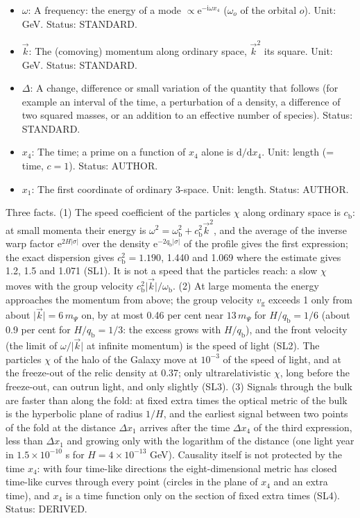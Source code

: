\documentclass[
  10pt,
]{article}
\begin{document}
\begin{itemize}
  differentials. Status: STANDARD.
\item
  \(\omega\): A frequency: the energy of a mode
  \(\propto \mathrm{e}^{-\mathrm{i}\omega x_4}\) (\(\omega_o\) of the
  orbital \(o\)). Unit: GeV. Status: STANDARD.
\item
  \(\vec k\): The (comoving) momentum along ordinary space, \(\vec k^2\)
  its square. Unit: GeV. Status: STANDARD.
\item
  \(\Delta\): A change, difference or small variation of the quantity
  that follows (for example an interval of the time, a perturbation of a
  density, a difference of two squared masses, or an addition to an
  effective number of species). Status: STANDARD.
\item
  \(x_4\): The time; a prime on a function of \(x_4\) alone is
  \(\mathrm{d}/\mathrm{d}x_4\). Unit: length (= time, \(c = 1\)).
  Status: AUTHOR.
\item
  \(x_1\): The first coordinate of ordinary 3-space. Unit: length.
  Status: AUTHOR.
\end{itemize}

Three facts. (1) The speed coefficient of the particles \(\chi\) along
ordinary space is \(c_{\mathrm{b}}\): at small momenta their energy is
\(\omega^2 = \omega_{\mathrm{b}}^2 + c_{\mathrm{b}}^2\vec k^2\), and the
average of the inverse warp factor \(\mathrm{e}^{2H\lvert\sigma\rvert}\)
over the density \(\mathrm{e}^{-2q_{\mathrm{b}}\lvert\sigma\rvert}\) of
the profile gives the first expression; the exact dispersion gives
\(c_{\mathrm{b}}^2 = 1.190\), 1.440 and 1.069 where the estimate gives
1.2, 1.5 and 1.071 (SL1). It is not a speed that the particles reach: a
slow \(\chi\) moves with the group velocity
\(c_{\mathrm{b}}^2\lvert\vec k\rvert/\omega_{\mathrm{b}}\). (2) At large
momenta the energy approaches the momentum from above; the group
velocity \(v_{\mathrm{g}}\) exceeds 1 only from about
\(\lvert\vec k\rvert = 6\,m_\Psi\) on, by at most 0.46 per cent near
\(13\,m_\Psi\) for \(H/q_{\mathrm{b}} = 1/6\) (about 0.9 per cent for
\(H/q_{\mathrm{b}} = 1/3\): the excess grows with \(H/q_{\mathrm{b}}\)),
and the front velocity (the limit of \(\omega/\lvert\vec k\rvert\) at
infinite momentum) is the speed of light (SL2). The particles \(\chi\)
of the halo of the Galaxy move at \(10^{-3}\) of the speed of light, and
at the freeze-out of the relic density at 0.37; only ultrarelativistic
\(\chi\), long before the freeze-out, can outrun light, and only
slightly (SL3). (3) Signals through the bulk are faster than along the
fold: at fixed extra times the optical metric of the bulk is the
hyperbolic plane of radius \(1/H\), and the earliest signal between two
points of the fold at the distance \(\Delta x_1\) arrives after the time
\(\Delta x_4\) of the third expression, less than \(\Delta x_1\) and
growing only with the logarithm of the distance (one light year in
\(1.5\times10^{-10}\) s for \(H = 4\times10^{-13}\) GeV). Causality
itself is not protected by the time \(x_4\): with four time-like
directions the eight-dimensional metric has closed time-like curves
through every point (circles in the plane of \(x_4\) and an extra time),
and \(x_4\) is a time function only on the section of fixed extra times
(SL4). Status: DERIVED.
\end{document}

